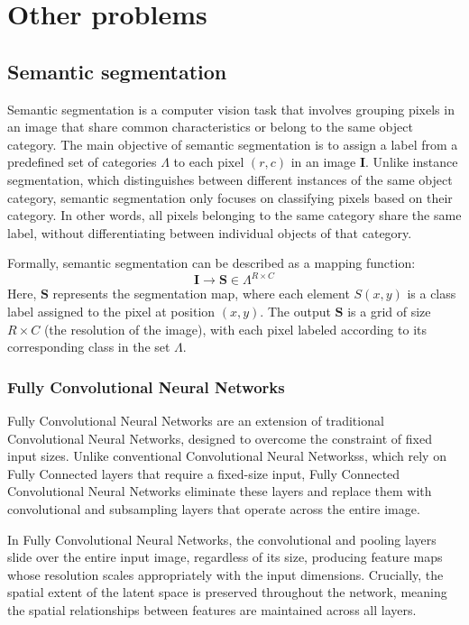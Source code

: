 \section{Other problems}

\subsection{Semantic segmentation}
Semantic segmentation is a computer vision task that involves grouping pixels in an image that share common characteristics or belong to the same object category. 
The main objective of semantic segmentation is to assign a label from a predefined set of categories $\Lambda$ to each pixel $(r, c)$ in an image $\mathbf{I}$.
Unlike instance segmentation, which distinguishes between different instances of the same object category, semantic segmentation only focuses on classifying pixels based on their category. 
In other words, all pixels belonging to the same category share the same label, without differentiating between individual objects of that category.

Formally, semantic segmentation can be described as a mapping function:
\[\mathbf{I}\rightarrow \mathbf{S}\in\Lambda^{R\times C}\]
Here, $\mathbf{S}$ represents the segmentation map, where each element $S(x, y)$ is a class label assigned to the pixel at position $(x, y)$. 
The output $\mathbf{S}$ is a grid of size $R \times C$ (the resolution of the image), with each pixel labeled according to its corresponding class in the set $\Lambda$.

\subsubsection{Fully Convolutional Neural Networks}
Fully Convolutional Neural Networks are an extension of traditional Convolutional Neural Networks, designed to overcome the constraint of fixed input sizes. 
Unlike conventional Convolutional Neural Networkss, which rely on Fully Connected layers that require a fixed-size input, Fully Connected Convolutional Neural Networks eliminate these layers and replace them with convolutional and subsampling layers that operate across the entire image.

In Fully Convolutional Neural Networks, the convolutional and pooling layers slide over the entire input image, regardless of its size, producing feature maps whose resolution scales appropriately with the input dimensions.
Crucially, the spatial extent of the latent space is preserved throughout the network, meaning the spatial relationships between features are maintained across all layers. 

